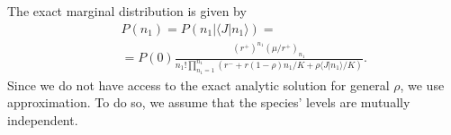 \documentclass[%
 amsmath,amssymb,
 reprint,%
]{revtex4-2}
\begin{document}


The exact marginal distribution is given by
\begin{eqnarray}
     &&P(n_1)= P\left(n_1|\langle J|n_1\rangle \right) = \\ \nonumber
     && = P(0)\frac{(r^+)^{n_1}(\mu/r^+)_{n_1}}{n_1!\prod_{n_1=1}^{n_1}(r^-+r(1-\rho)n_1/K+\rho \langle J |n_1 \rangle /K)}.
\end{eqnarray}
 Since we do not have access to the exact analytic solution for general $\rho$, we use approximation. To do so, we assume that the species' levels are mutually independent.
\end{document}
